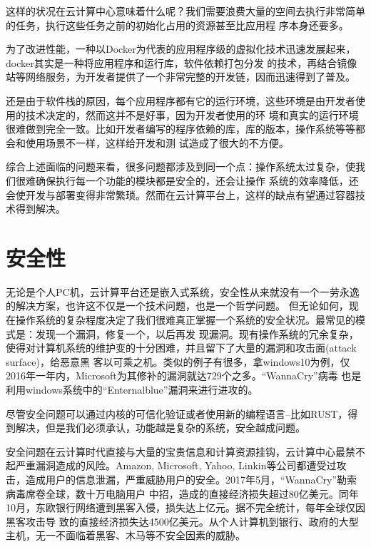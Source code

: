 这样的状况在云计算中心意味着什么呢？我们需要浪费大量的空间去执行非常简单的任务，执行这些任务之前的初始化占用的资源甚至比应用程
序本身还要多。

为了改进性能，一种以Docker为代表的应用程序级的虚拟化技术迅速发展起来，docker其实是一种将应用程序和运行库，软件依赖打包分发
的技术，再结合镜像站等网络服务，为开发者提供了一个非常完整的开发链，因而迅速得到了普及。

还是由于软件栈的原因，每个应用程序都有它的运行环境，这些环境是由开发者使用的技术决定的，然而这并不是好事，因为开发者使用的环
境和真实的运行环境很难做到完全一致。比如开发者编写的程序依赖的库，库的版本，操作系统等等都会和使用场景不一样，这样给开发和测
试造成了很大的不方便。

综合上述面临的问题来看，很多问题都涉及到同一个点：操作系统太过复杂，使我们很难确保执行每一个功能的模块都是安全的，还会让操作
系统的效率降低，还会使开发与部署变得非常繁琐。然而在云计算平台上，这样的缺点有望通过容器技术得到解决。

\section{安全性}
无论是个人PC机，云计算平台还是嵌入式系统，安全性从来就没有一个一劳永逸的解决方案，也许这不仅是一个技术问题，也是一个哲学问题。
但无论如何，现在操作系统的复杂程度决定了我们很难真正掌握一个系统的安全状况。最常见的模式是：发现一个漏洞，修复一个，以后再发
现漏洞。现有操作系统的冗余复杂，使得对计算机系统的维护变的十分困难，并且留下了大量的漏洞和攻击面(attack surface)，给恶意黑
客以可乘之机。类似的例子有很多，拿windows10为例，仅2016年一年内，Microsoft为其修补的漏洞就达729个之多。“WannaCry”病毒
也是利用windows系统中的“Enternalblue”漏洞来进行进攻的。

尽管安全问题可以通过内核的可信化验证或者使用新的编程语言--比如RUST，得到解决，但是我们必须承认，功能越是复杂的系统，安全越成问题。

安全问题在云计算时代直接与大量的宝贵信息和计算资源挂钩，云计算中心最禁不起严重漏洞造成的风险。Amazon, Microsoft, Yahoo,
Linkin等公司都遭受过攻击，造成用户的信息泄漏，严重威胁用户的安全。2017年5月，“WannaCry”勒索病毒席卷全球，数十万电脑用户
中招，造成的直接经济损失超过80亿美元。同年10月，东欧银行网络遭到黑客入侵，损失达上亿元。据不完全统计，每年全球仅因黑客攻击导
致的直接经济损失达4500亿美元。从个人计算机到银行、政府的大型主机，无一不面临着黑客、木马等不安全因素的威胁。